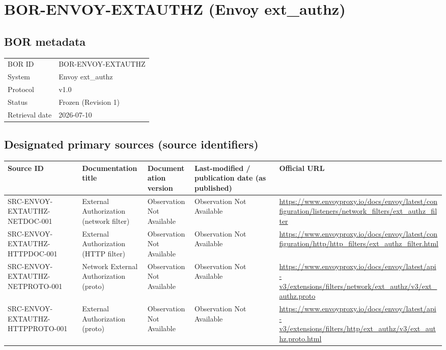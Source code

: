 \documentclass[11pt]{article}
\begin{document}
\section*{BOR-ENVOY-EXTAUTHZ (Envoy ext\_authz)}
\subsection*{BOR metadata}
\begin{tabular}{@{}L{2.2in}L{4.2in}@{}}
\toprule
BOR ID & BOR-ENVOY-EXTAUTHZ\\
System & Envoy ext\_authz\\
Protocol & v1.0\\
Status & Frozen (Revision 1)\\
Retrieval date & 2026-07-10\\
\bottomrule
\end{tabular}

\subsection*{Designated primary sources (source identifiers)}
\begin{longtable}{@{}L{1.6in}L{2.9in}L{1.0in}L{0.9in}L{1.9in}@{}}
\toprule
Source ID & Documentation title & Documentation version & Last-modified / publication date (as published) & Official URL\\
\midrule
\endhead
SRC-ENVOY-EXTAUTHZ-NETDOC-001 & External Authorization (network filter) & Observation Not Available & Observation Not Available & \url{https://www.envoyproxy.io/docs/envoy/latest/configuration/listeners/network_filters/ext_authz_filter}\\
SRC-ENVOY-EXTAUTHZ-HTTPDOC-001 & External Authorization (HTTP filter) & Observation Not Available & Observation Not Available & \url{https://www.envoyproxy.io/docs/envoy/latest/configuration/http/http_filters/ext_authz_filter.html}\\
SRC-ENVOY-EXTAUTHZ-NETPROTO-001 & Network External Authorization (proto) & Observation Not Available & Observation Not Available & \url{https://www.envoyproxy.io/docs/envoy/latest/api-v3/extensions/filters/network/ext_authz/v3/ext_authz.proto}\\
SRC-ENVOY-EXTAUTHZ-HTTPPROTO-001 & External Authorization (proto) & Observation Not Available & Observation Not Available & \url{https://www.envoyproxy.io/docs/envoy/latest/api-v3/extensions/filters/http/ext_authz/v3/ext_authz.proto.html}\\
\bottomrule
\end{longtable}
\end{document}
